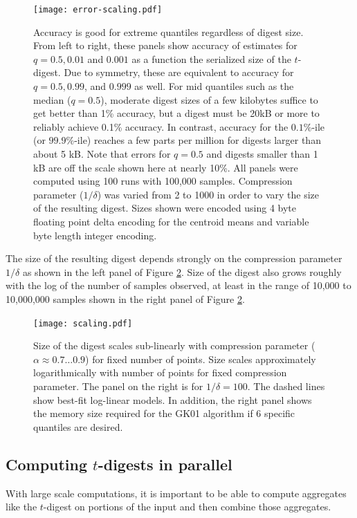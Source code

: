 \documentclass[11pt]{amsart}
\begin{document}
\begin{figure}[htb] %
   \centering
   \texttt{[image: error-scaling.pdf]} 
   \caption{Accuracy is good for extreme quantiles regardless of digest size.  From left to right, these panels show accuracy of estimates for $q=0.5, 0.01$ and $0.001$ as a function the serialized size of the $t$-digest.  Due to symmetry, these are equivalent to accuracy for $q=0.5, 0.99$, and $0.999$ as well. For mid quantiles such as the median ($q=0.5$), moderate digest sizes of a few kilobytes suffice to get better than 1\% accuracy, but a digest must be 20kB or more to reliably achieve 0.1\% accuracy.  In contrast, accuracy for the $0.1\%$-ile (or $99.9\%$-ile) reaches a few parts per million for digests larger than about 5 kB.  Note that errors for $q=0.5$ and digests smaller than 1 kB are off the scale shown here at nearly 10\%.  All panels were computed using 100 runs with 100,000 samples.  Compression parameter ($1/\delta$) was varied from 2 to 1000 in order to vary the size of the resulting digest.  Sizes shown were encoded using 4 byte floating point delta encoding for the centroid means and variable byte length integer encoding.}
   \label{fig:accuracy-1}
\end{figure}
The size of the resulting digest depends strongly on the compression parameter $1/\delta$ as shown in the left panel of Figure \ref{fig:accuracy-2}.  Size of the digest also grows roughly with the log of the number of samples observed, at least in the range of 10,000 to 10,000,000 samples shown in the right panel of Figure \ref{fig:accuracy-2}.

\begin{figure}[htb] %
   \centering
   \texttt{[image: scaling.pdf]} 
   \caption{Size of the digest scales sub-linearly with compression parameter ($\alpha \approx 0.7 \ldots 0.9$) for fixed number of points.  Size scales approximately logarithmically with number of points for fixed compression parameter.  The panel on the right is for $1/\delta = 100$.  The dashed lines show best-fit log-linear models.  In addition, the right panel shows the memory size required for the GK01 algorithm if 6 specific quantiles are desired.}
   \label{fig:accuracy-2}
\end{figure}

\subsection{Computing $t$-digests in parallel}
With large scale computations, it is important to be able to compute aggregates like the $t$-digest on portions of the input and then combine those aggregates.  
\end{document}
